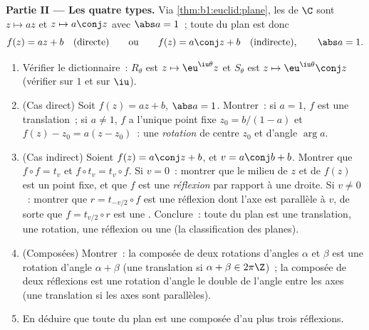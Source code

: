 \begin{problem}
\medskip
\noindent\textbf{Partie II --- Les quatre types.} Via
\cref{thm:b1:euclid:plane}, les   de $\C$ sont $z
\mapsto az$ et $z \mapsto a\conj z$ avec $\abs a = 1$~; toute
 du plan est donc
\[
f(z) = a z + b \quad (\text{directe}) \qquad\text{ou}\qquad
f(z) = a\conj z + b \quad (\text{indirecte}), \qquad \abs a = 1 .
\]
\begin{enumerate}[resume]
  \item Vérifier le dictionnaire~: $R_\theta$ est $z \mapsto
        \eu^{\iu\theta}z$ et $S_\theta$ est $z \mapsto
        \eu^{\iu\theta}\conj z$ (vérifier sur $1$ et sur $\iu$).
  \item (Cas direct) Soit $f(z) = az + b$, $\abs a = 1$. Montrer~:
        si $a = 1$, $f$ est une translation~; si $a \neq 1$, $f$ a
        l'unique point fixe $z_0 = b/(1 - a)$ et $f(z) - z_0
        = a(z - z_0)$~: une \emph{rotation} de centre $z_0$ et
        d'angle $\arg a$.
  \item (Cas indirect) Soient $f(z) = a\conj z + b$, et $v =
        a\conj b + b$. Montrer que $f \circ f = t_v$ et $f \circ
        t_v = t_v \circ f$. Si $v = 0$~: montrer que le milieu de
        $z$ et de $f(z)$ est un point fixe, et que $f$ est une
        \emph{réflexion} par rapport à une droite. Si $v \neq 0$~:
        montrer que $r = t_{-v/2}\circ f$ est une réflexion dont
        l'axe est parallèle à $v$, de sorte que $f = t_{v/2}
        \circ r$ est une \emph{}. Conclure~: toute
         du plan est une translation, une rotation, une
        réflexion ou une  (la classification des
         planes).
  \item (Composées) Montrer~: la composée de deux rotations
        d'angles $\alpha$ et $\beta$ est une rotation d'angle
        $\alpha + \beta$ (une translation si $\alpha + \beta \in
        2\pi\Z$)~; la composée de deux réflexions est une
        rotation d'angle le double de l'angle entre les axes (une
        translation si les axes sont parallèles).
  \item En déduire que toute  du plan est une composée
        d'au plus trois réflexions.
\end{enumerate}


\end{problem}
